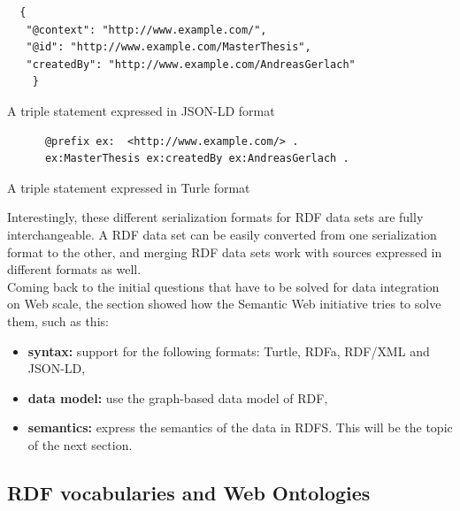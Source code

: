 \begin{listing}[H]
	\begin{verbatim}
  {
   "@context": "http://www.example.com/",
   "@id": "http://www.example.com/MasterThesis",
   "createdBy": "http://www.example.com/AndreasGerlach"
 	}
	\end{verbatim}
\caption{A triple statement expressed in \gls{JSON-LD} format}
\label{lst:jsonld_meta_data}
\end{listing}

\begin{listing}[H]
	\begin{verbatim}
	  @prefix ex:  <http://www.example.com/> .
	  ex:MasterThesis ex:createdBy ex:AndreasGerlach .
	\end{verbatim}
\caption{A triple statement expressed in Turle format}
\label{lst:turtle_meta_data}
\end{listing}

Interestingly, these different serialization formats for \gls{RDF} data sets are fully interchangeable. A \gls{RDF} data set can be easily converted from one serialization format to the other, and merging \gls{RDF} data sets work with sources expressed in different formats as well. \\

Coming back to the initial questions that have to be solved for data integration on Web scale, the section showed how the Semantic Web initiative tries to solve them, such as this: \@

\begin{itemize}
	\item \textbf{syntax:} support for the following formats: Turtle, \gls{RDFa}, \gls{RDF}/\gls{XML} and \gls{JSON-LD},
	\item \textbf{data model:} use the graph-based data model of \gls{RDF},
	\item \textbf{semantics:} express the semantics of the data in \gls{RDFS}. This will be the topic of the next section.
\end{itemize}


\subsection{\gls{RDF} vocabularies and Web Ontologies}
\label{sec:semantic_vocab_ontologies}

